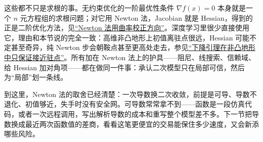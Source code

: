这些都不只是求根的事。无约束优化的一阶最优性条件 \(\nabla f(x)=0\) 本身就是一个 \(n\) 元方程组的求根问题；对它用 Newton 法，Jacobian 就是 Hessian，得到的正是二阶优化方法，见\hyperref[sec:09-Convex-Optimization/06-Optimization-Algorithms/02]{``Newton 法用曲率校正方向''}。深度学习里很少直接使用它，理由和本节说的完全一致：高维非凸地形上初值离驻点很远，Hessian 可能不定甚至奇异，纯 Newton 步会朝鞍点甚至更高处走去，参见\hyperref[sec:09-Convex-Optimization/08-Nonconvex-and-Stochastic-Optimization/01]{``下降引理在非凸地形中只保证接近驻点''}。所有加在 Newton 法上的护具——阻尼、线搜索、信赖域、给 Hessian 加对角项——都在做同一件事：承认二次模型只在局部可信，然后为``局部''划一条线。

到这里，Newton 法的取舍已经清楚：一次导数换二次收敛，前提是可导、导数不退化、初值够近，失手时没有安全网。可导数常常拿不到——函数是一段仿真代码，或者一次远程调用，写出解析导数的成本和重写整个模型差不多。下一节把导数换成最近两次函数值的差商，看看这笔更便宜的交易能保住多少速度，又会新添哪些风险。
